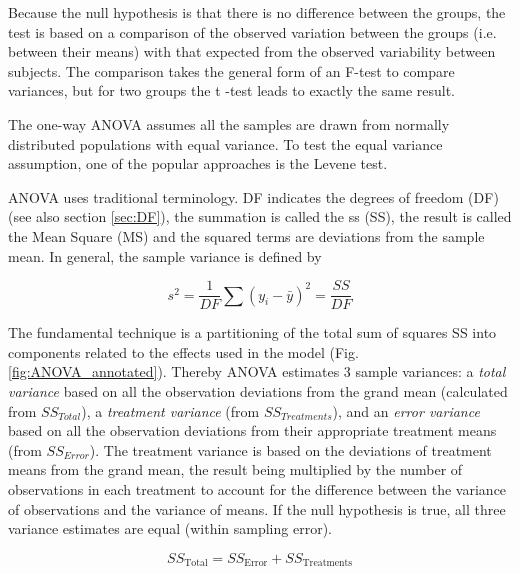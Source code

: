 Because the null hypothesis is that there is no difference between the groups, the test is based on a comparison of the observed variation between the groups (i.e. between their means) with that expected from the observed variability between subjects. The comparison takes the general form of an F-test to compare variances, but for two groups the t -test leads to exactly the same result.

The one-way ANOVA assumes all the samples are drawn from normally distributed populations with equal variance. To test the equal variance assumption, one of the popular approaches is the Levene test.

ANOVA uses traditional terminology. DF indicates the degrees of freedom (DF) (see also section \ref{sec:DF}), the summation is called the \acrfull{ss} (SS), the result is called the Mean Square (MS) and the squared terms are deviations from the sample mean.
In general, the sample variance is defined by

\begin{equation}\label{eq:sampleVariance}
  s^2 = \frac{1}{DF} \sum (y_i - \bar{y})^2 = \frac{SS}{DF}
\end{equation}

The fundamental technique is a partitioning of the total sum of squares SS into components related to the effects used in the model (Fig. \ref{fig:ANOVA_annotated}). Thereby ANOVA estimates 3 sample variances: a \emph{total variance} based on all the observation deviations from the grand mean (calculated from $SS_{Total}$), a \emph{treatment variance} (from $SS_{Treatments}$), and an \emph{error variance} based on all the observation deviations from their appropriate treatment means (from $SS_{Error}$). The treatment variance is based on the deviations of treatment means from the grand mean, the result being multiplied by the number of observations in each treatment to account for the difference between the variance of observations and the variance of means. If the null hypothesis is true, all three variance estimates are equal (within sampling error).

\begin{equation}
  SS_\text{Total} = SS_\text{Error} + SS_\text{Treatments}
\end{equation}

